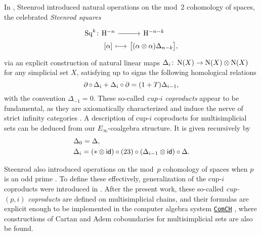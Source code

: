 In \cite{steenrod1947products}, Steenrod introduced natural operations on the mod~2 cohomology of spaces, the celebrated \textit{Steenrod squares}
\[
\begin{tikzcd} [column sep=small, row sep=0]
	\Sq^k \colon &[-20] \rH^{-n} \arrow[r] & \rH^{-n-k} \\ &
	{[\alpha]} \arrow[r, mapsto] & \big[ (\alpha \ot \alpha) \Delta_{n-k} \big],
\end{tikzcd}
\]
via an explicit construction of natural linear maps $\Delta_i \colon \operatorname{N}(X) \to \operatorname{N}(X) \otimes \operatorname{N}(X)$ for any simplicial set $X$, satisfying up to signs the following homological relations
\[
\operatorname{\partial} \circ \, \Delta_i + \Delta_i \circ \operatorname{\partial} = (1 + T) \Delta_{i-1},
\]
with the convention $\Delta_{-1} = 0$.
These so-called \textit{cup-$i$ coproducts} appear to be fundamental, as they are axiomatically characterized \cite{medina2022axiomatic} and induce the nerve of strict infinity categories \cite{medina2020globular}.
A description of cup-$i$ coproducts for multisimplicial sets can be deduced from our $E_\infty$-coalgebra structure.
It is given recursively by
\[
\begin{split}
	& \Delta_0 = \Delta, \\
	& \Delta_i =
	(\ast \otimes \mathsf{id}) \circ (23) \circ (\Delta_{i-1} \otimes \mathsf{id}) \circ \Delta.
\end{split}
\]

Steenrod also introduced operations on the mod~$p$ cohomology of spaces when $p$ is an odd prime \cite{steenrod1952reduced, steenrod1953cyclic}.
To define these effectively, generalization of the cup-$i$ coproducts were introduced in \cite{medina2021may_st}.
After the present work, these so-called \textit{cup-$(p,i)$ coproducts} are defined on multisimplicial chains, and their formulas are explicit enough to be implemented in the computer algebra system \href{https://comch.readthedocs.io/en/latest/}{\texttt{ComCH}} \cite{medina2021comch}, where constructions of Cartan and Adem coboundaries \cite{medina2020cartan,medina2021adem} for multisimplicial sets are also be found.
